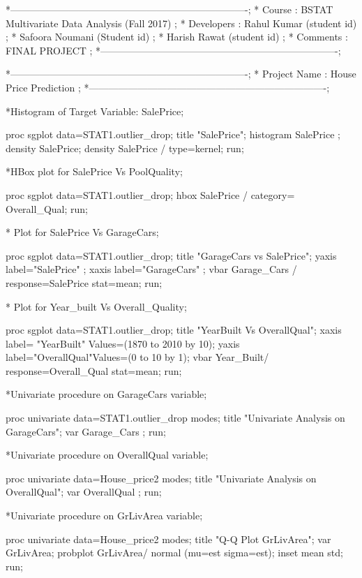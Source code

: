 *-------------------------------------------------------------------------;
* Course	     : BSTAT  Multivariate Data Analysis	(Fall 2017)	      ;
* Developers	 : Rahul Kumar (student id)								  ;
* 				   Safoora Noumani (Student id)							  ;
*				   Harish Rawat (student id)								  ;
* Comments       : FINAL PROJECT   										  ;
*-------------------------------------------------------------------------;

*-------------------------------------------------------------------------;
* Project Name		: House Price Prediction							  ;
*-------------------------------------------------------------------------;

*Histogram of Target Variable: SalePrice;

proc sgplot data=STAT1.outlier_drop;
title "SalePrice";
histogram SalePrice ;
density SalePrice;
density SalePrice / type=kernel;
run;

*HBox plot for SalePrice Vs PoolQuality;

proc sgplot data=STAT1.outlier_drop;
hbox SalePrice / category= Overall_Qual;
run;

* Plot for SalePrice Vs GarageCars;

proc sgplot data=STAT1.outlier_drop;
title "GarageCars vs SalePrice";
yaxis label="SalePrice" ;
xaxis label="GarageCars" ;
vbar Garage_Cars / response=SalePrice stat=mean; 
run;

* Plot for Year_built Vs Overall_Quality;

proc sgplot data=STAT1.outlier_drop;
title "YearBuilt Vs OverallQual";
xaxis label= "YearBuilt" Values=(1870 to 2010 by 10);
yaxis label="OverallQual"Values=(0 to 10 by 1);
vbar   Year_Built/ response=Overall_Qual stat=mean; 
run;

*Univariate procedure on GarageCars variable;

proc univariate data=STAT1.outlier_drop modes;
title "Univariate Analysis on GarageCars";
var Garage_Cars ;
run;

*Univariate procedure on OverallQual variable;

proc univariate data=House_price2 modes;
title "Univariate Analysis on OverallQual";
var OverallQual ;
run;

*Univariate procedure on GrLivArea variable;

proc univariate data=House_price2 modes;
title "Q-Q Plot GrLivArea";
var GrLivArea;
probplot GrLivArea/ normal (mu=est sigma=est);
inset mean std;
run;



